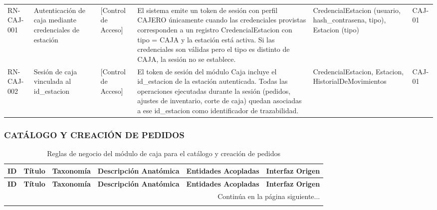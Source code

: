 \begin{landscape}
\begin{longtable}[c]{l p{2.1cm} p{2.1cm} p{8cm} p{4cm} p{3cm}}
RN-CAJ-001 & Autenticación de caja mediante credenciales de estación & [Control de Acceso] & El sistema emite un token de sesión con perfil CAJERO únicamente cuando las credenciales provistas corresponden a un registro CredencialEstacion con tipo = CAJA y la estación está activa. Si las credenciales son válidas pero el tipo es distinto de CAJA, la sesión no se establece. & CredencialEstacion (usuario, hash\_contrasena, tipo), Estacion (tipo) & CAJ-01 \\
\addlinespace
RN-CAJ-002 & Sesión de caja vinculada al id\_estacion & [Control de Acceso] & El token de sesión del módulo Caja incluye el id\_estacion de la estación autenticada. Todas las operaciones ejecutadas durante la sesión (pedidos, ajustes de inventario, corte de caja) quedan asociadas a ese id\_estacion como identificador de trazabilidad. & CredencialEstacion, Estacion, HistorialDeMovimientos & CAJ-01 \\
\end{longtable}
\endgroup

\subsubsection{CATÁLOGO Y CREACIÓN DE PEDIDOS}
\begingroup
\setlength{\LTleft}{\fill}
\setlength{\LTright}{\fill}

\begin{longtable}[c]{l p{2.1cm} p{2.1cm} p{8cm} p{4cm} p{3cm}}
\caption{Reglas de negocio del módulo de caja para el catálogo y creación de pedidos} \label{tab:reglas-negocio-caja-catalogo-creacion-pedidos}\\
\toprule
\textbf{ID} & \textbf{Título} & \textbf{Taxonomía} & \textbf{Descripción Anatómica} & \textbf{Entidades Acopladas} & \textbf{Interfaz Origen} \\
\midrule
\endfirsthead

\toprule
\textbf{ID} & \textbf{Título} & \textbf{Taxonomía} & \textbf{Descripción Anatómica} & \textbf{Entidades Acopladas} & \textbf{Interfaz Origen} \\
\midrule
\endhead

\midrule
\multicolumn{6}{r}{\small Continúa en la página siguiente...} \\
\endfoot
\bottomrule
\endlastfoot


\end{longtable}
\end{landscape}
